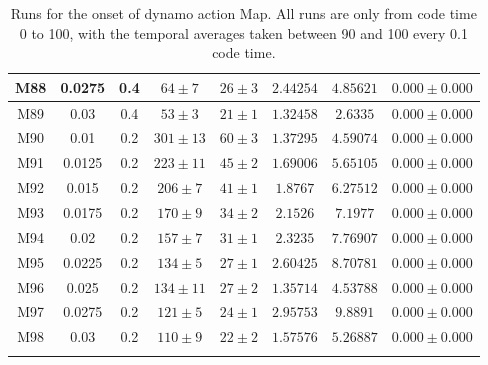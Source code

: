 \documentclass[12pt,a4paper]{report}
\begin{document}
\begin{center}
\begin{longtable}{||c|c|c|c|c|c|c|c||}
M88 & 0.0275 & 0.4 & $ 64 \pm 7 $ & $ 26 \pm 3 $ & $ 2.44254 $ & $ 4.85621 $ & $ 0.000 \pm 0.000 $ \\ \hline
M89 & 0.03 & 0.4 & $ 53 \pm 3 $ & $ 21 \pm 1 $ & $ 1.32458 $ & $ 2.6335 $ & $ 0.000 \pm 0.000 $ \\ \hline
M90 & 0.01 & 0.2 & $ 301 \pm 13 $ & $ 60 \pm 3 $ & $ 1.37295 $ & $ 4.59074 $ & $ 0.000 \pm 0.000 $ \\ \hline
M91 & 0.0125 & 0.2 & $ 223 \pm 11 $ & $ 45 \pm 2 $ & $ 1.69006 $ & $ 5.65105 $ & $ 0.000 \pm 0.000 $ \\ \hline
M92 & 0.015 & 0.2 & $ 206 \pm 7 $ & $ 41 \pm 1 $ & $ 1.8767 $ & $ 6.27512 $ & $ 0.000 \pm 0.000 $ \\ \hline
M93 & 0.0175 & 0.2 & $ 170 \pm 9 $ & $ 34 \pm 2 $ & $ 2.1526 $ & $ 7.1977 $ & $ 0.000 \pm 0.000 $ \\ \hline
M94 & 0.02 & 0.2 & $ 157 \pm 7 $ & $ 31 \pm 1 $ & $ 2.3235 $ & $ 7.76907 $ & $ 0.000 \pm 0.000 $ \\ \hline
M95 & 0.0225 & 0.2 & $ 134 \pm 5 $ & $ 27 \pm 1 $ & $ 2.60425 $ & $ 8.70781 $ & $ 0.000 \pm 0.000 $ \\ \hline
M96 & 0.025 & 0.2 & $ 134 \pm 11 $ & $ 27 \pm 2 $ & $ 1.35714 $ & $ 4.53788 $ & $ 0.000 \pm 0.000 $ \\ \hline
M97 & 0.0275 & 0.2 & $ 121 \pm 5 $ & $ 24 \pm 1 $ & $ 2.95753 $ & $ 9.8891 $ & $ 0.000 \pm 0.000 $ \\ \hline
M98 & 0.03 & 0.2 & $ 110 \pm 9 $ & $ 22 \pm 2 $ & $ 1.57576 $ & $ 5.26887 $ & $ 0.000 \pm 0.000 $ \\ \hline
\caption{Runs for the onset of dynamo action Map. All runs are only from code time 0 to 100, with the temporal averages taken between 90 and 100 every 0.1 code time.}
\label{tableB2}
\end{longtable}
\end{center}
\end{document}
